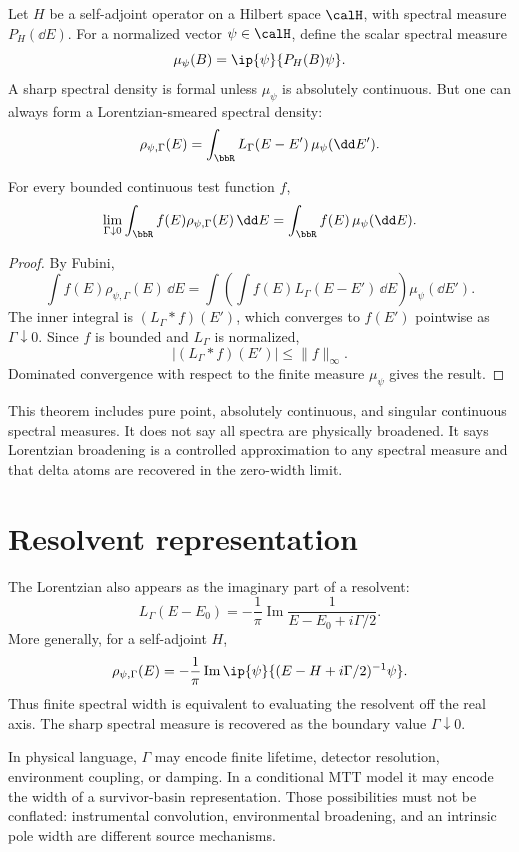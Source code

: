 \documentclass[11pt]{article}
\begin{document}
Let $H$ be a self-adjoint operator on a Hilbert space $\calH$, with spectral measure $P_H(\dd E)$. For a normalized vector $\psi\in\calH$, define the scalar spectral measure
\[
\mu_\psi(B)=\ip{\psi}{P_H(B)\psi}.
\]
A sharp spectral density is formal unless $\mu_\psi$ is absolutely continuous. But one can always form a Lorentzian-smeared spectral density:
\[
\rho_{\psi,\Gamma}(E)
=
\int_{\bbR}L_\Gamma(E-E')\,\mu_\psi(\dd E').
\]

\begin{theorem}
For every bounded continuous test function $f$,
\[
\lim_{\Gamma\downarrow0}
\int_{\bbR} f(E)\rho_{\psi,\Gamma}(E)\,\dd E
=
\int_{\bbR} f(E)\,\mu_\psi(\dd E).
\]
\end{theorem}

\begin{proof}
By Fubini,
\[
\int f(E)\rho_{\psi,\Gamma}(E)\,\dd E
=
\int \left(\int f(E)L_\Gamma(E-E')\,\dd E\right)\mu_\psi(\dd E').
\]
The inner integral is $(L_\Gamma*f)(E')$, which converges to $f(E')$ pointwise as $\Gamma\downarrow0$. Since $f$ is bounded and $L_\Gamma$ is normalized,
\[
|(L_\Gamma*f)(E')|\le \|f\|_\infty.
\]
Dominated convergence with respect to the finite measure $\mu_\psi$ gives the result.
\end{proof}

\begin{remark}
This theorem includes pure point, absolutely continuous, and singular continuous spectral measures. It does not say all spectra are physically broadened. It says Lorentzian broadening is a controlled approximation to any spectral measure and that delta atoms are recovered in the zero-width limit.
\end{remark}

\section{Resolvent representation}

The Lorentzian also appears as the imaginary part of a resolvent:
\[
L_\Gamma(E-E_0)
=
-\frac{1}{\pi}\operatorname{Im}\frac{1}{E-E_0+i\Gamma/2}.
\]
More generally, for a self-adjoint $H$,
\[
\rho_{\psi,\Gamma}(E)
=
-\frac{1}{\pi}\operatorname{Im}\ip{\psi}{(E-H+i\Gamma/2)^{-1}\psi}.
\]
Thus finite spectral width is equivalent to evaluating the resolvent off the real axis. The sharp spectral measure is recovered as the boundary value $\Gamma\downarrow0$.

In physical language, $\Gamma$ may encode finite lifetime, detector resolution, environment coupling, or damping. In a conditional MTT model it may encode the width of a survivor-basin representation. Those possibilities must not be conflated: instrumental convolution, environmental broadening, and an intrinsic pole width are different source mechanisms.
\end{document}
